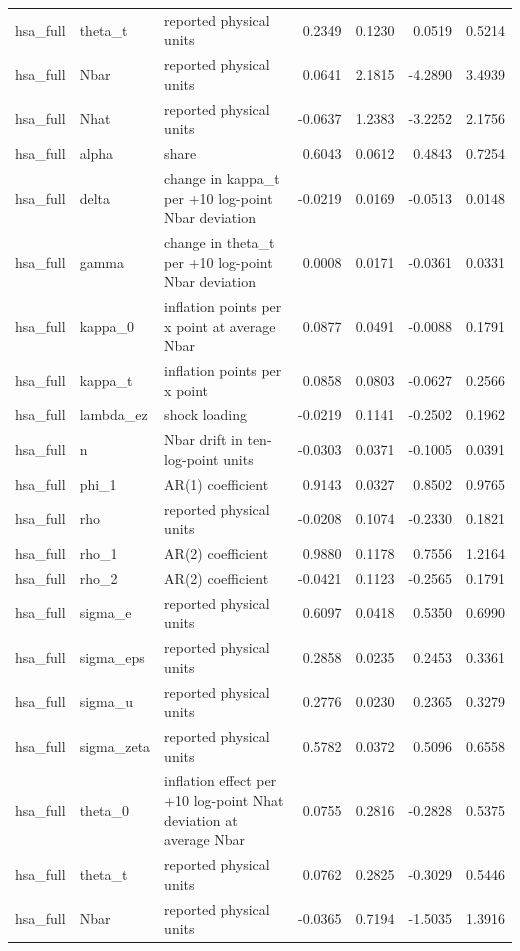 \begin{tabular}{lllrrrr}
hsa\_full & theta\_t & reported physical units & 0.2349 & 0.1230 & 0.0519 & 0.5214 \\
hsa\_full & Nbar & reported physical units & 0.0641 & 2.1815 & -4.2890 & 3.4939 \\
hsa\_full & Nhat & reported physical units & -0.0637 & 1.2383 & -3.2252 & 2.1756 \\
hsa\_full & alpha & share & 0.6043 & 0.0612 & 0.4843 & 0.7254 \\
hsa\_full & delta & change in kappa\_t per +10 log-point Nbar deviation & -0.0219 & 0.0169 & -0.0513 & 0.0148 \\
hsa\_full & gamma & change in theta\_t per +10 log-point Nbar deviation & 0.0008 & 0.0171 & -0.0361 & 0.0331 \\
hsa\_full & kappa\_0 & inflation points per x point at average Nbar & 0.0877 & 0.0491 & -0.0088 & 0.1791 \\
hsa\_full & kappa\_t & inflation points per x point & 0.0858 & 0.0803 & -0.0627 & 0.2566 \\
hsa\_full & lambda\_ez & shock loading & -0.0219 & 0.1141 & -0.2502 & 0.1962 \\
hsa\_full & n & Nbar drift in ten-log-point units & -0.0303 & 0.0371 & -0.1005 & 0.0391 \\
hsa\_full & phi\_1 & AR(1) coefficient & 0.9143 & 0.0327 & 0.8502 & 0.9765 \\
hsa\_full & rho & reported physical units & -0.0208 & 0.1074 & -0.2330 & 0.1821 \\
hsa\_full & rho\_1 & AR(2) coefficient & 0.9880 & 0.1178 & 0.7556 & 1.2164 \\
hsa\_full & rho\_2 & AR(2) coefficient & -0.0421 & 0.1123 & -0.2565 & 0.1791 \\
hsa\_full & sigma\_e & reported physical units & 0.6097 & 0.0418 & 0.5350 & 0.6990 \\
hsa\_full & sigma\_eps & reported physical units & 0.2858 & 0.0235 & 0.2453 & 0.3361 \\
hsa\_full & sigma\_u & reported physical units & 0.2776 & 0.0230 & 0.2365 & 0.3279 \\
hsa\_full & sigma\_zeta & reported physical units & 0.5782 & 0.0372 & 0.5096 & 0.6558 \\
hsa\_full & theta\_0 & inflation effect per +10 log-point Nhat deviation at average Nbar & 0.0755 & 0.2816 & -0.2828 & 0.5375 \\
hsa\_full & theta\_t & reported physical units & 0.0762 & 0.2825 & -0.3029 & 0.5446 \\
hsa\_full & Nbar & reported physical units & -0.0365 & 0.7194 & -1.5035 & 1.3916 \\

\end{tabular}
